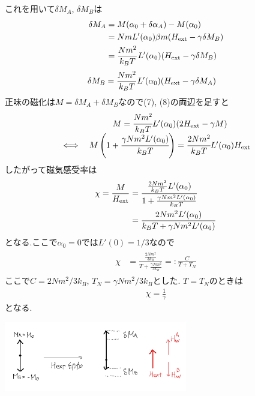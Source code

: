 \documentclass[uplatex,a4j,11pt,dvipdfmx]{jsarticle}
\makeatletter
\def\fgcaption{\def\@captype{figure}\caption}
\makeatother
\begin{document}
これを用いて$\delta M_A$, $\delta M_B$は
\begin{align}
  \begin{split}
    \delta M_A&=M(\alpha_0+\delta\alpha_A)-M(\alpha_0)\\
    &=NmL'(\alpha_0)\beta m(H_{\rm ext}-\gamma\delta M_B)\\
    &=\frac{Nm^2}{k_BT}L'(\alpha_0)(H_{\rm ext}-\gamma\delta M_B)
  \end{split}
\end{align}
\begin{align}
  \begin{split}
    \delta M_B&=\frac{Nm^2}{k_BT}L'(\alpha_0)(H_{\rm ext}-\gamma\delta M_A)
  \end{split}
\end{align}
正味の磁化は$M=\delta M_A+\delta M_B$なので(7), (8)の両辺を足すと
\begin{align}
  \begin{array}{cc}
    &M=\cfrac{Nm^2}{k_BT}L'(\alpha_0)(2H_{\rm ext}-\gamma M)\\
    \iff&M\left(1+\cfrac{\gamma Nm^2L'(\alpha_0)}{k_BT}\right)=\cfrac{2Nm^2}{k_BT}L'(\alpha_0)H_{\rm ext}
  \end{array}
\end{align}
したがって磁気感受率は
\begin{align}
  \begin{split}
    \chi=\frac{M}{H_{\rm ext}}&=\frac{\frac{2Nm^2}{k_BT}L'(\alpha_0)}{1+\frac{\gamma Nm^2L'(\alpha_0)}{k_BT}}\\
    &=\frac{2Nm^2L'(\alpha_0)}{k_BT+\gamma Nm^2L'(\alpha_0)}
  \end{split}
\end{align}
となる.ここで$\alpha_0=0$では$L'(0)=1/3$なので
\begin{align}
  \begin{split}
    \chi&=\frac{\frac{2Nm^2}{3k_B}}{T+\frac{\gamma Nm^2}{3k_B}}=:\frac{C}{T+T_N}
  \end{split}
\end{align}
ここで$C=2Nm^2/3k_B$, $T_N=\gamma Nm^2/3k_B$とした.
$T=T_N$のときは
\begin{align}
  \chi=\frac{1}{\gamma}
\end{align}
となる.
\begin{center}
  \includegraphics[width=8cm]{1_coord.png}
  \fgcaption{反強磁性体に磁場を印加した際の磁化の挙動}
\end{center}
\end{document}
